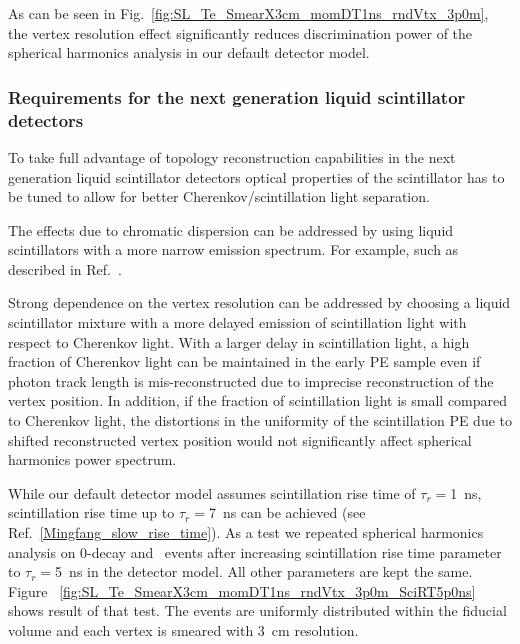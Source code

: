 As can be seen in Fig.~\ref{fig:SL_Te_SmearX3cm_momDT1ns_rndVtx_3p0m}, the vertex resolution effect significantly reduces discrimination power 
of the spherical harmonics analysis in our default detector model.



\subsubsection{Requirements for the next generation liquid scintillator detectors}
To take full advantage of topology reconstruction capabilities in the next generation liquid scintillator detectors optical properties of the 
scintillator has to be tuned to allow for better Cherenkov/scintillation light separation.

The effects due to chromatic dispersion can be addressed by using liquid scintillators with a more narrow emission spectrum. For example,
such as described in Ref.~\cite{LS_narrow_emission}.

Strong dependence on the vertex resolution can be addressed by choosing a liquid scintillator mixture with a more delayed emission 
of scintillation light with respect to Cherenkov light. With a larger delay in scintillation light, a high fraction of Cherenkov light 
can be maintained in the early PE sample even if photon track length is mis-reconstructed due to imprecise reconstruction of the vertex 
position. In addition, if the fraction of scintillation light is small compared to Cherenkov light, the distortions in the uniformity of 
the scintillation PE due to shifted reconstructed vertex position would not significantly affect spherical harmonics power spectrum.

While our default detector model assumes scintillation rise time of $\tau_r=$1~ns, scintillation rise time up to $\tau_r=$7~ns can 
be achieved (see Ref.~\ref{Mingfang_slow_rise_time}). As a test we repeated spherical harmonics analysis on 0\nbb-decay and \B~events after
increasing scintillation rise time parameter to $\tau_r=$5~ns in the detector model. All other parameters are kept the same.
Figure ~\ref{fig:SL_Te_SmearX3cm_momDT1ns_rndVtx_3p0m_SciRT5p0ns} shows result of that test. The events are uniformly distributed within 
the fiducial volume and each vertex is smeared with 3~cm resolution. 

